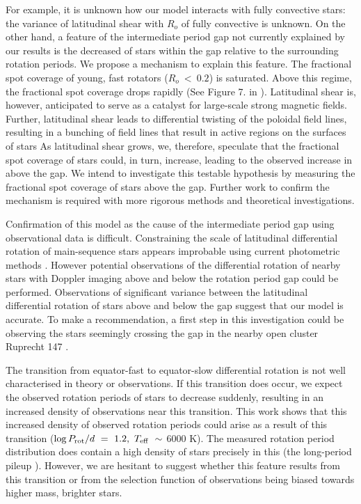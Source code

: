 For example, it is unknown how our model interacts with fully convective stars: the variance of latitudinal shear with $R_o$ of fully convective is unknown.
On the other hand, a feature of the intermediate period gap not currently explained by our results is the decreased \rper{} of stars within the gap relative to the surrounding rotation periods.
We propose a mechanism to explain this feature.
The fractional spot coverage of young, fast rotators ($R_o \ < \ 0.2$) is saturated.
Above this regime, the fractional spot coverage drops rapidly (See Figure 7. in \citet{cao_starspots_2022}).
Latitudinal shear is, however, anticipated to serve as a catalyst for large-scale strong magnetic fields.
Further, latitudinal shear leads to differential twisting of the poloidal field lines, resulting in a bunching of field lines that result in active regions on the surfaces of stars \citep[see, e.g.,][]{berdyugina_starspots_2005, miesch_large-scale_2005, magnetism_brun_2017}
As latitudinal shear grows, we, therefore, speculate that the fractional spot coverage of stars could, in turn, increase, leading to the observed increase in \rper{} above the gap.
We intend to investigate this testable hypothesis by measuring the fractional spot coverage of stars above the gap.
Further work to confirm the mechanism is required with more rigorous methods and theoretical investigations.

Confirmation of this model as the cause of the intermediate period gap using observational data is difficult.
Constraining the scale of latitudinal differential rotation of main-sequence stars appears improbable using current photometric methods \citep[See Section 4.3 of][]{aigrain_hare_2015}.
However potential observations of the differential rotation of nearby stars with Doppler imaging above and below the rotation period gap could be performed.
Observations of significant variance between the latitudinal differential rotation of stars above and below the gap suggest that our model is accurate.
To make a recommendation, a first step in this investigation could be observing the stars seemingly crossing the gap in the nearby open cluster Ruprecht 147 \citep{curtis_when_2020}.

The transition from equator-fast to equator-slow differential rotation is not well characterised in theory or observations.
If this transition does occur, we expect the observed rotation periods of stars to decrease suddenly, resulting in an increased density of observations near this transition.
This work shows that this increased density of observed rotation periods could arise as a result of this transition ($\log P_{\rm{rot}}/d \ = \ 1.2, \ T_{\rm{eff}} \ \sim $ 6000 K).
The measured \kepler{} rotation period distribution does contain a high density of stars precisely in this (the long-period pileup \citep{van_saders_forward_2019} ). However, we are hesitant to suggest whether this feature results from this transition or from the selection function of \kepler{} observations being biased towards higher mass, brighter stars.

